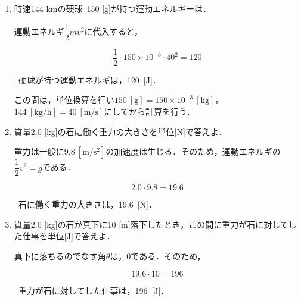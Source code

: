 \documentclass[a4paper,11pt]{ltjsarticle}
\begin{document}
\begin{enumerate}
  \begin{equation}
    \dfrac{1}{2} \cdot 2.0 \cdot \sqrt{29}^2 = 29
  \end{equation}

  \therefore\ 質点の運動エネルギは，29\ [J]．


\clearpage
  
  \item 時速144 kmの硬球\ 150 [g]が持つ運動エネルギーは．


  運動エネルギ$\dfrac{1}{2}mv^2$に代入すると，

  \begin{equation}
    \dfrac{1}{2} \cdot 150 \times 10^{-3} \cdot 40^2 = 120
  \end{equation}

    \therefore\   硬球が持つ運動エネルギは，120\ [J]．


  この問は，単位換算を行い$150\ [\mathrm{g}] = 150 \times 10^{-3}\ [\mathrm{kg}]$，$144\ [\mathrm{kg/h}] = 40\ [\mathrm{m/s}]$にしてから計算を行う．

  
  \item 質量2.0 [kg]の石に働く重力の大きさを単位[N]で答えよ．


  重力は一般に$9.8\ [\mathrm{m/s^2}]$の加速度は生じる．そのため，運動エネルギの$\dfrac{1}{2}v^2 = g$である．

  \begin{equation}
    2.0 \cdot 9.8 = 19.6
  \end{equation}

  \therefore\ 石に働く重力の大きさは，19.6\ [N]．

  
  \item 質量2.0 [kg]の石が真下に10 [m]落下したとき，この間に重力が石に対してした仕事を単位[J]で答えよ．


  真下に落ちるのでなす角$\theta$は，0である．そのため，

  \begin{equation}
    19.6 \cdot 10 = 196
  \end{equation}

  \therefore\ 重力が石に対してした仕事は，196\ [J]．



\end{enumerate}
\end{document}
